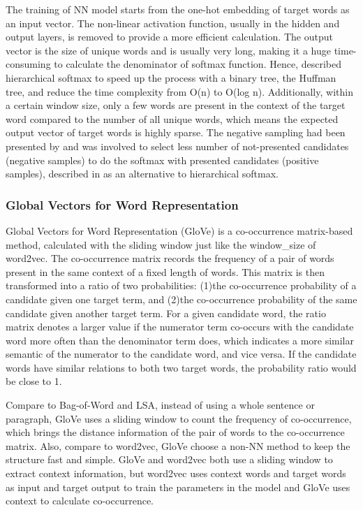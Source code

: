 The training of NN model starts from the one-hot embedding of target words as an input vector.
The non-linear activation function, usually in the hidden and output layers, is removed to provide a more efficient calculation.
The output vector is the size of unique words and is usually very long, making it a huge time-consuming to calculate the denominator of softmax function.
Hence, \cite{mikolov2013efficient} described hierarchical softmax to speed up the process with a binary tree, the Huffman tree, and reduce the time complexity from O(n) to O(log n).
Additionally, within a certain window size, only a few words are present in the context of the target word compared to the number of all unique words, which means the expected output vector of target words is highly sparse.
The negative sampling had been presented by \cite{mnih2012} \cite{gutmann2012} and was involved to select less number of not-presented candidates (negative samples) to do the softmax with presented candidates (positive samples), described in \cite{mikolov2013distributed} as an alternative to hierarchical softmax.

\subsubsection{Global Vectors for Word Representation}
Global Vectors for Word Representation (GloVe) is a co-occurrence matrix-based method, calculated with the sliding window just like the window_size of word2vec.
The co-occurrence matrix records the frequency of a pair of words present in the same context of a fixed length of words.
This matrix is then transformed into a ratio of two probabilities: (1)the co-occurrence probability of a candidate given one target term, and (2)the co-occurrence probability of the same candidate given another target term.
For a given candidate word, the ratio matrix denotes a larger value if the numerator term co-occurs with the candidate word more often than the denominator term does, which indicates a more similar semantic of the numerator to the candidate word, and vice versa.
If the candidate words have similar relations to both two target words, the probability ratio would be close to 1.

Compare to Bag-of-Word and LSA, instead of using a whole sentence or paragraph, GloVe uses a sliding window to count the frequency of co-occurrence, which brings the distance information of the pair of words to the co-occurrence matrix.
Also, compare to word2vec, GloVe choose a non-NN method to keep the structure fast and simple.
GloVe and word2vec both use a sliding window to extract context information, but word2vec uses context words and target words as input and target output to train the parameters in the model and GloVe uses context to calculate co-occurrence.

